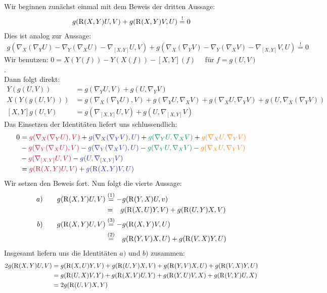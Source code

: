 \begin{bew}
Wir beginnen zunächst einmal mit dem Beweis der dritten Aussage:
\begin{align*}	
g(\operatorname{R}(X,Y)U,V)+g(\operatorname{R}(X,Y)V,U) \overset{!}{=} 0 
\end{align*}
Dies ist analog zur Aussage:
\begin{align*}
g(\nabla_X(\nabla_YU)-\nabla_Y(\nabla_XU)-\nabla_{[X,Y]}U,V) +g(\nabla_X(\nabla_YV)-\nabla_Y(\nabla_XV)-\nabla_{[X,Y]}V,U) \overset{!}{=} 0
\end{align*}
Wir benutzen: $0 = X(Y(f))-Y(X(f))-[X,Y](f)\quad$ für $f = g(U,V)$. \\
Dann folgt direkt: 
\begin{align*}
Y(g(U,V)) &= g(\nabla_YU,V) + g(U,\nabla_YV)\\
X(Y(g(U,V))) &= g(\nabla_X(\nabla_YU),V) + g(\nabla_YU,\nabla_XV) + g(\nabla_XU,\nabla_YV) + g(U,\nabla_X(\nabla_YV)) \\
[X,Y]g(U,V) &= g(\nabla_{[X,Y]}U,V)+g(U,\nabla_{[X,Y]}V)
\end{align*}
Das Einsetzen der Identitäten liefert uns schlussendlich:
\begin{align*}
	0 &= \color{myred}{g(\nabla_X(\nabla_YU),V)} \normalcolor+ \color{Blue}{g(\nabla_X(\nabla_YV),U)} \normalcolor+ \color{PineGreen}{g(\nabla_YU,\nabla_XV)} \normalcolor+ \color{BurntOrange}{g(\nabla_XU,\nabla_YV)} \\ \normalcolor
	&- \color{myred}{g(\nabla_Y(\nabla_XU),V)} \normalcolor- \color{Blue}{g(\nabla_Y(\nabla_XV),U)} \normalcolor- \color{PineGreen}{g(\nabla_YU,\nabla_XV)} \normalcolor- \color{BurntOrange}{g(\nabla_XU,\nabla_YV)} \\ \normalcolor
	&- \color{myred}{g(\nabla_{[X,Y]}U,V)} \normalcolor- \color{Blue}{g(U,\nabla_{[X,Y]}V)} \\ \normalcolor
	&= \color{myred}{g(\curv(X,Y)U,V)} \normalcolor + \color{Blue}{g(\curv(X,Y)V,U)} 
\end{align*}
Wir setzen den Beweis fort. Nun folgt die vierte Aussage:
\begin{align*}
a) \qquad g(\operatorname{R}(X,Y)U,V) &\overset{\tiny{(1)}}{=} -g(\operatorname{R}(Y,X)U,v) \\
&= \phantom{-}g(\operatorname{R}(X,U)Y,V) + g(\operatorname{R}(U,Y)X,V) \\
b) \qquad g(\operatorname{R}(X,Y)U,V) &\overset{\tiny{(3)}}{=} -g(\operatorname{R}(X,Y)V,U) \\
&\overset{\tiny{(2)}}{=} \phantom{-}g(\operatorname{R}(Y,V)X,U) + g(\operatorname{R}(V,X)Y,U) 
\end{align*}
Insgesamt liefern uns die Identitäten $a)$ und $b)$ zusammen:
\begin{align*}
	2g(\operatorname{R}(X,Y)U,V) &= g(\operatorname{R}(X,U)Y,V) + g(\operatorname{R}(U,Y)X,V) + g(\operatorname{R}(Y,V)X,U) + g(\operatorname{R}(V,X)Y,U) \\
	&= g(\operatorname{R}(U,X)V,Y) + g(\operatorname{R}(X,V)U,Y) + g(\operatorname{R}(Y,U)V,X) + g(\operatorname{R}(V,Y)U,X) \\
	&= 2g(\operatorname{R}(U,V)X,Y)
\end{align*}

\end{bew}


